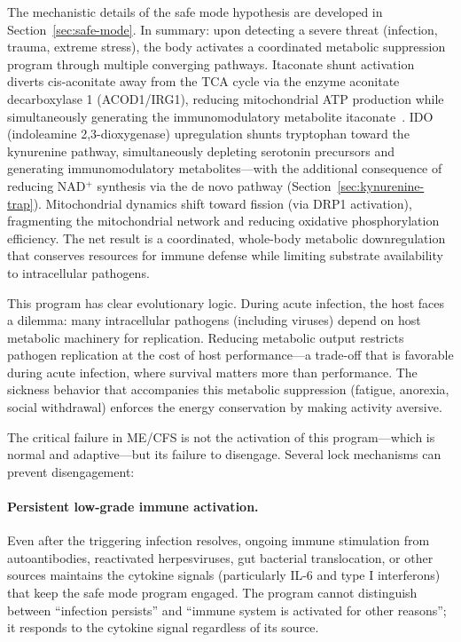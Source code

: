 The mechanistic details of the safe mode hypothesis are developed in Section~\ref{sec:safe-mode}. In summary: upon detecting a severe threat (infection, trauma, extreme stress), the body activates a coordinated metabolic suppression program through multiple converging pathways. Itaconate shunt activation diverts cis-aconitate away from the TCA cycle via the enzyme aconitate decarboxylase 1 (ACOD1/IRG1), reducing mitochondrial ATP production while simultaneously generating the immunomodulatory metabolite itaconate~\cite{Naviaux2016metabolomics}. IDO (indoleamine 2,3-dioxygenase) upregulation shunts tryptophan toward the kynurenine pathway, simultaneously depleting serotonin precursors and generating immunomodulatory metabolites---with the additional consequence of reducing NAD$^+$ synthesis via the de novo pathway (Section~\ref{sec:kynurenine-trap}). Mitochondrial dynamics shift toward fission (via DRP1 activation), fragmenting the mitochondrial network and reducing oxidative phosphorylation efficiency. The net result is a coordinated, whole-body metabolic downregulation that conserves resources for immune defense while limiting substrate availability to intracellular pathogens.

This program has clear evolutionary logic. During acute infection, the host faces a dilemma: many intracellular pathogens (including viruses) depend on host metabolic machinery for replication. Reducing metabolic output restricts pathogen replication at the cost of host performance---a trade-off that is favorable during acute infection, where survival matters more than performance. The sickness behavior that accompanies this metabolic suppression (fatigue, anorexia, social withdrawal) enforces the energy conservation by making activity aversive.

The critical failure in ME/CFS is not the activation of this program---which is normal and adaptive---but its failure to disengage. Several lock mechanisms can prevent disengagement:

\paragraph{Persistent low-grade immune activation.} Even after the triggering infection resolves, ongoing immune stimulation from autoantibodies, reactivated herpesviruses, gut bacterial translocation, or other sources maintains the cytokine signals (particularly IL-6 and type I interferons) that keep the safe mode program engaged. The program cannot distinguish between ``infection persists'' and ``immune system is activated for other reasons''; it responds to the cytokine signal regardless of its source.

